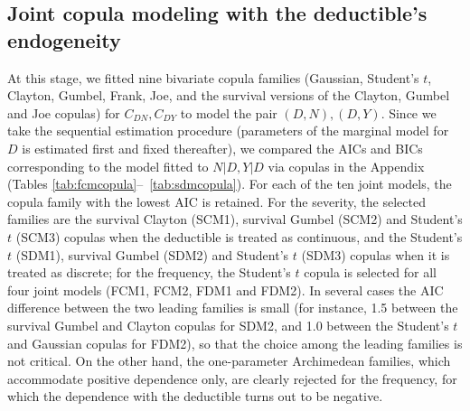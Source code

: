 \documentclass[11pt]{article}
\newcommand{\rev}[1]{{\color{blue}#1}}
\begin{document}
\FloatBarrier

\subsection{Joint copula modeling with the deductible's endogeneity}\label{sec:jointcopula}

At this stage, we fitted \rev{nine bivariate copula families (Gaussian, Student's $t$, Clayton, Gumbel, Frank, Joe, and the survival versions of the Clayton, Gumbel and Joe copulas)} for $C_{DN},C_{DY}$ to model the pair $(D, N),(D, Y)$. Since we take the sequential estimation procedure (parameters of the marginal model for $D$ is estimated first and fixed thereafter), we compared the AICs and BICs corresponding to the model fitted to $N|D, Y|D$ via copulas in the Appendix (Tables \ref{tab:fcmcopula}--~\ref{tab:sdmcopula}). \rev{For each of the ten joint models, the copula family with the lowest AIC is retained. For the severity, the selected families are the survival Clayton (SCM1), survival Gumbel (SCM2) and Student's $t$ (SCM3) copulas when the deductible is treated as continuous, and the Student's $t$ (SDM1), survival Gumbel (SDM2) and Student's $t$ (SDM3) copulas when it is treated as discrete; for the frequency, the Student's $t$ copula is selected for all four joint models (FCM1, FCM2, FDM1 and FDM2). In several cases the AIC difference between the two leading families is small (for instance, 1.5 between the survival Gumbel and Clayton copulas for SDM2, and 1.0 between the Student's $t$ and Gaussian copulas for FDM2), so that the choice among the leading families is not critical. On the other hand, the one-parameter Archimedean families, which accommodate positive dependence only, are clearly rejected for the frequency, for which the dependence with the deductible turns out to be negative.}
\end{document}
